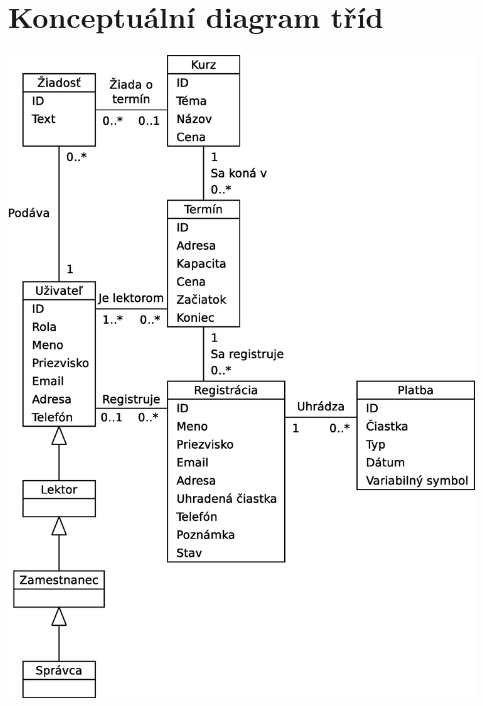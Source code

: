 \documentclass[12pt,a4paper,titlepage,final]{report}
\begin{document}
\section{Konceptuální diagram tříd}

		\begin{center}
			\captionsetup{type=figure}
			\includegraphics[height=17cm]{img/konceptualny_diagram_tried.eps}
		\end{center}
		
	
\end{document}
